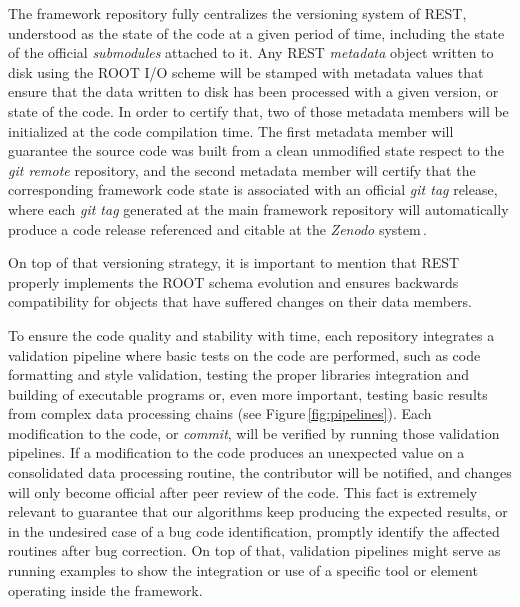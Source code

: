 The framework repository fully centralizes the versioning system of REST, understood as the state of the code at a given period of time, including the state of the official \emph{submodules} attached to it. Any REST \emph{metadata} object written to disk using the ROOT I/O scheme will be stamped with metadata values that ensure that the data written to disk has been processed with a given version, or state of the code. In order to certify that, two of those metadata members will be initialized at the code compilation time. The first metadata member will guarantee the source code was built from a clean unmodified state respect to the \emph{git remote} repository, and the second metadata member will certify that the corresponding framework code state is associated with an official \emph{git tag} release, where each \emph{git tag} generated at the main framework repository will automatically produce a code release referenced and citable at the \emph{Zenodo} system\,\cite{javier_galan_2021_5092550}.

On top of that versioning strategy, it is important to mention that REST properly implements the ROOT schema evolution and ensures backwards compatibility for objects that have suffered changes on their data members.




To ensure the code quality and stability with time, each repository integrates a validation pipeline where basic tests on the code are performed, such as code formatting and style validation, testing the proper libraries integration and building of executable programs or, even more important, testing basic results from complex data processing chains (see Figure\,\ref{fig:pipelines}). Each modification to the code, or \emph{commit}, will be verified by running those validation pipelines. If a modification to the code produces an unexpected value on a consolidated data processing routine, the contributor will be notified, and changes will only become official after peer review of the code. This fact is extremely relevant to guarantee that our algorithms keep producing the expected results, or in the undesired case of a bug code identification, promptly identify the affected routines after bug correction. On top of that, validation pipelines might serve as running examples to show the integration or use of a specific tool or element operating inside the framework.



